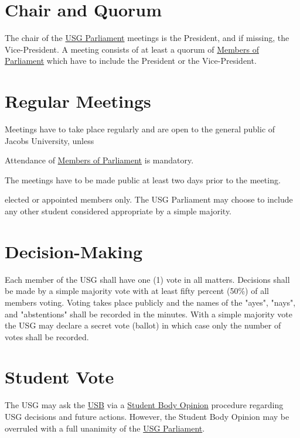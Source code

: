 

\section{Chair and Quorum}
The chair of the \hyperref[USGParliamentDef]{USG Parliament} meetings is the President, and if missing, the Vice-President. A meeting consists of at least a quorum of  \hyperref[MPDef]{Members of Parliament} which have to include the President or the Vice-President.

\section{Regular Meetings}
Meetings have to take place regularly and are open to the general public of Jacobs University, unless 
\begin{parenum}
\item Attendance of \hyperref[MPDef]{Members of Parliament} is mandatory.
\item The meetings have to be made public at least two days prior to the meeting.
\item {} elected or appointed members only. The USG Parliament may choose to include any other student  considered appropriate by a simple majority. 
\end{parenum}


\section{Decision-Making} 
Each member of the USG shall have one (1) vote in all matters. Decisions shall be made by a simple majority vote with at least fifty percent (50\%) of all members voting. Voting takes place publicly and the names of the "ayes", "nays", and "abstentions" shall be recorded in the minutes. With a simple majority vote the USG may declare a secret vote (ballot) in which case only the number of votes shall be recorded. 


\section{Student Vote}
The USG may ask the \hyperref[studentbody]{USB} via a \hyperref[StudentOpiniondef]{Student Body Opinion} procedure regarding USG decisions and future actions. However, the Student Body Opinion may be overruled with a full unanimity of the \hyperref[USGParliamentDef]{USG Parliament}.



